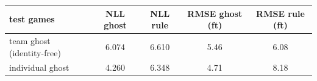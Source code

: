 \begin{tabular}{lcccc}
\hline
test games & NLL ghost & NLL rule & RMSE ghost (ft) & RMSE rule (ft) \\
\hline
team ghost (identity-free) & 6.074 & 6.610 & 5.46 & 6.08 \\
individual ghost & 4.260 & 6.348 & 4.71 & 8.18 \\
\hline
\end{tabular}
